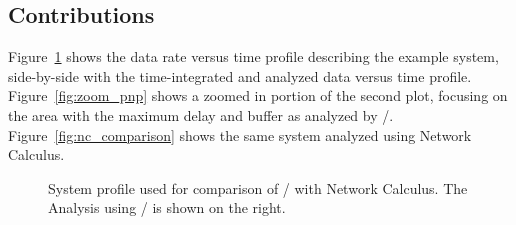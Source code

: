 \subsection{Contributions}

Figure~\ref{fig:system_comparison} shows the data rate versus time
profile describing the example system, side-by-side with the
time-integrated and analyzed data versus time profile.
Figure~\ref{fig:zoom_pnp} shows a zoomed in portion of the second
plot, focusing on the area with the maximum delay and buffer as
analyzed by \shorttool/.  Figure~\ref{fig:nc_comparison} shows the
same system analyzed using Network Calculus.

\begin{figure}[ht!]
  \centering
  \caption{System profile used for comparison of \shorttool/ with
    Network Calculus.  The Analysis using \shorttool/ is shown on the right.}
  \label{fig:system_comparison}
\end{figure}

